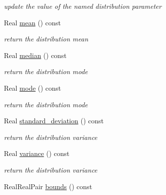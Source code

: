 \begin{DoxyCompactItemize}
\begin{DoxyCompactList}\small\item\em update the value of the named distribution parameter \end{DoxyCompactList}\item 
Real \hyperlink{classPecos_1_1NegBinomialRandomVariable_a962ffe5a3593be370d5c883365c060f4}{mean} () const \label{classPecos_1_1NegBinomialRandomVariable_a962ffe5a3593be370d5c883365c060f4}

\begin{DoxyCompactList}\small\item\em return the distribution mean \end{DoxyCompactList}\item 
Real \hyperlink{classPecos_1_1NegBinomialRandomVariable_ae1fff19ce29a79d657043a598523635d}{median} () const \label{classPecos_1_1NegBinomialRandomVariable_ae1fff19ce29a79d657043a598523635d}

\begin{DoxyCompactList}\small\item\em return the distribution mode \end{DoxyCompactList}\item 
Real \hyperlink{classPecos_1_1NegBinomialRandomVariable_a72d3d6926edd929cb3f8e12baa655f70}{mode} () const \label{classPecos_1_1NegBinomialRandomVariable_a72d3d6926edd929cb3f8e12baa655f70}

\begin{DoxyCompactList}\small\item\em return the distribution mode \end{DoxyCompactList}\item 
Real \hyperlink{classPecos_1_1NegBinomialRandomVariable_a6a4ed9624d511f8a4e4f509c82cb0706}{standard\+\_\+deviation} () const \label{classPecos_1_1NegBinomialRandomVariable_a6a4ed9624d511f8a4e4f509c82cb0706}

\begin{DoxyCompactList}\small\item\em return the distribution variance \end{DoxyCompactList}\item 
Real \hyperlink{classPecos_1_1NegBinomialRandomVariable_a4b8b05b2a9af92dad9cc304c2925a4eb}{variance} () const \label{classPecos_1_1NegBinomialRandomVariable_a4b8b05b2a9af92dad9cc304c2925a4eb}

\begin{DoxyCompactList}\small\item\em return the distribution variance \end{DoxyCompactList}\item 
Real\+Real\+Pair \hyperlink{classPecos_1_1NegBinomialRandomVariable_a4bdb95a8fa5fffaa0de5102f56963cf2}{bounds} () const \label{classPecos_1_1NegBinomialRandomVariable_a4bdb95a8fa5fffaa0de5102f56963cf2}


\end{DoxyCompactItemize}
